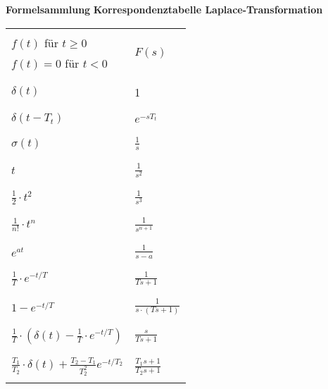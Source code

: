 {\Large\bf Formelsammlung}
\vskip 24pt
{\large\bf Korrespondenztabelle Laplace-Transformation}
\vskip 12pt

\begin{tabularx}{\textwidth}{|p{11cm}|X|} 
	\hline
	&\\
	\(f(t)\) für \(t\ge 0\) & \multirow{2}{*}{\(F(s)\)} \\
	\(f(t)=0\) für \(t<0\) & \\
	&\\
	\hline
	\hline
	&\\
	\(\delta(t)\) & 1 \\
	&\\
	\hline
	&\\
	\(\delta(t-T_t)\) & \(e^{-sT_t}\) \\
	&\\
	\hline
	&\\
	\(\sigma(t)\) & \(\frac{1}{s}\)\\
	&\\
	\hline
	&\\
	\(t\) & \(\frac{1}{s^2}\)\\
	&\\
	\hline
	&\\
	\(\frac{1}{2}\cdot t^2\) & \(\frac{1}{s^3}\)\\
	&\\
	\hline
	&\\
	\(\frac{1}{n!}\cdot t^n\) & \(\frac{1}{s^{n+1}}\)\\
	&\\
	\hline
	&\\
	\(e^{at}\) & \(\frac{1}{s-a}\)\\
	&\\
	\hline
	&\\
	\(\frac{1}{T}\cdot e^{-t/T}\) & \(\frac{1}{Ts+1}\) \\
	&\\
	\hline
	&\\
	\(1-e^{-t/T}\) & \(\frac{1}{s\cdot(Ts+1)}\) \\
	&\\
	\hline
	&\\
	\(\frac{1}{T}\cdot\left(\delta(t)-\frac{1}{T}\cdot e^{-t/T}\right)\) & \(\frac{s}{Ts+1}\) \\
	&\\
	\hline
	&\\
	\(\frac{T_1}{T_2}\cdot\delta(t)+\frac{T_2-T_1}{T_2^2} e^{-t/T_2}\) & \(\frac{T_1s+1}{T_2s+1}\)  \\
	&\\
	\hline
\end{tabularx}
\newpage

